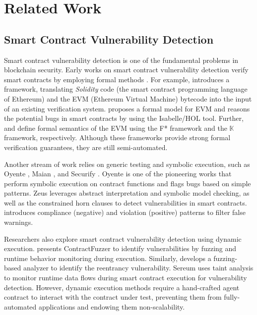 \vspace{-0.7em}
\section{Related Work}
\label{related_work}

\subsection{Smart Contract Vulnerability Detection}
Smart contract vulnerability detection is one of the fundamental problems in blockchain security. Early works on smart contract vulnerability detection verify smart contracts by employing formal methods \cite{Bhargavan,Grishchenko,Hildenbrandt,Hirai}. For example, \cite{Bhargavan} introduces a framework, translating \emph{Solidity} code (the smart contract programming language of Ethereum) and the EVM (Ethereum Virtual Machine) bytecode into the input of an existing verification system. \cite{Hirai} proposes a formal model for EVM and reasons the potential bugs in smart contracts by using the Isabelle/HOL tool. Further, \cite{Grishchenko} and \cite{Hildenbrandt} define formal semantics of the EVM using the F* framework and the $\mathbb{K}$ framework, respectively. Although these frameworks provide strong formal verification guarantees, they are still semi-automated. 

Another stream of work relies on generic testing and symbolic execution, such as Oyente \cite{oyente}, Maian \cite{Maian}, and Securify \cite{securify}. Oyente is one of the pioneering works that perform symbolic execution on contract functions and flags bugs based on simple patterns. Zeus \cite{zeus} leverages abstract interpretation and symbolic model checking, as well as the constrained horn clauses to detect vulnerabilities in smart contracts. \cite{securify} introduces compliance (negative) and violation (positive) patterns to filter false warnings. 

Researchers also explore smart contract vulnerability detection using dynamic execution. \cite{contractfuzzer} presents ContractFuzzer to identify vulnerabilities by fuzzing and runtime behavior monitoring during execution. Similarly, \cite{reguard} develops a fuzzing-based analyzer to identify the reentrancy vulnerability. Sereum \cite{sereum} uses taint analysis to monitor runtime data flows during smart contract execution for vulnerability detection. However, dynamic execution methods require a hand-crafted agent contract to interact with the contract under test, preventing them from fully-automated applications and endowing them non-scalability.  

